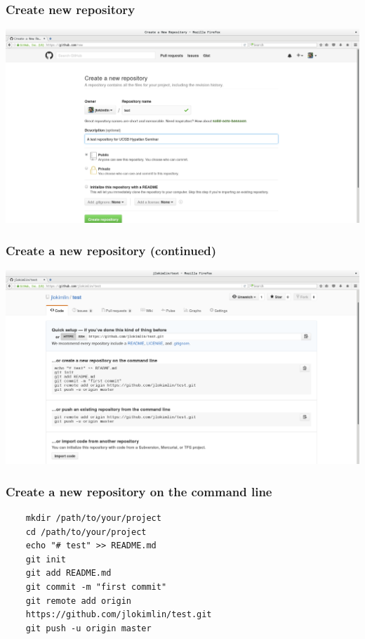 %
%
\begin{frame}[fragile]
  \frametitle{
    Create new repository
  }

  \begin{center}
    \includegraphics[scale=0.155]{./graphics/create_new_repository.png}
  \end{center}

\end{frame}

%
%
\begin{frame}[fragile]
  \frametitle{
    Create a new repository (continued)
  }
  
  \begin{center}
    \includegraphics[scale=0.15]{./graphics/new_repo_continued.png}
  \end{center}

\end{frame}

%
%
\begin{frame}[fragile]
  \frametitle{
    Create a new repository on the command line
  }

  \begin{lstlisting}
    mkdir /path/to/your/project
    cd /path/to/your/project
    echo "# test" >> README.md
    git init
    git add README.md
    git commit -m "first commit"
    git remote add origin
    https://github.com/jlokimlin/test.git
    git push -u origin master
  \end{lstlisting}
\end{frame}

